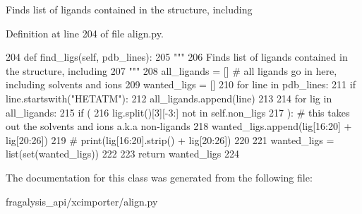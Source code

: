 \begin{DoxyVerb}Finds list of ligands contained in the structure, including
\end{DoxyVerb}
 

Definition at line 204 of file align.\+py.


\begin{DoxyCode}
204     \textcolor{keyword}{def }find\_ligs(self, pdb\_lines):
205         \textcolor{stringliteral}{"""}
206 \textcolor{stringliteral}{        Finds list of ligands contained in the structure, including}
207 \textcolor{stringliteral}{        """}
208         all\_ligands = []  \textcolor{comment}{# all ligands go in here, including solvents and ions}
209         wanted\_ligs = []
210         \textcolor{keywordflow}{for} line \textcolor{keywordflow}{in} pdb\_lines:
211             \textcolor{keywordflow}{if} line.startswith(\textcolor{stringliteral}{"HETATM"}):
212                 all\_ligands.append(line)
213 
214         \textcolor{keywordflow}{for} lig \textcolor{keywordflow}{in} all\_ligands:
215             \textcolor{keywordflow}{if} (
216                     lig.split()[3][-3:] \textcolor{keywordflow}{not} \textcolor{keywordflow}{in} self.non\_ligs
217             ):  \textcolor{comment}{# this takes out the solvents and ions a.k.a non-ligands}
218                 wanted\_ligs.append(lig[16:20] + lig[20:26])
219                 \textcolor{comment}{# print(lig[16:20].strip() + lig[20:26])}
220 
221         wanted\_ligs = list(set(wanted\_ligs))
222 
223         \textcolor{keywordflow}{return} wanted\_ligs
224 
\end{DoxyCode}


The documentation for this class was generated from the following file\+:\begin{DoxyCompactItemize}
\item 
fragalysis\+\_\+api/xcimporter/align.\+py\end{DoxyCompactItemize}
